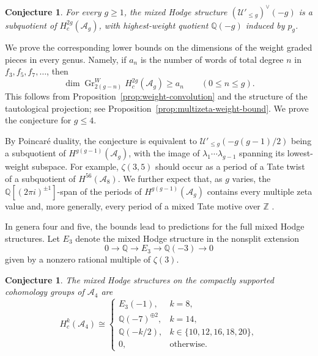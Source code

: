\documentclass[12 pt]{amsart}
\newcommand{\QQ}{\mathbb{Q}}
\newcommand{\ZZ}{\mathbb{Z}}
\newcommand{\cA}{\mathcal{A}}
\newcommand{\cU}{\mathcal{U}}
\newcommand{\Gr}{\operatorname{Gr}}
\newcommand{\<}{\langle}
\renewcommand{\>}{\rangle}
\newtheorem{conjecture}[theorem]{Conjecture}
\theoremstyle{definition}
\begin{document}
\begin{conjecture}\label{conj:multizeta-socle}
For every $g \geq 1$, the mixed Hodge structure $(\cU'_{\leq g})^\vee(-g)$ is a subquotient of $H_c^{2g}(\cA_g)$, with highest-weight quotient $\QQ(-g)$ induced by $p_g$.
\end{conjecture}

\noindent We prove the corresponding lower bounds on the dimensions of the weight graded pieces in every genus. Namely, if $a_n$ is the number of words of total degree $n$ in $f_3, f_5, f_7, \ldots$, then
\[
\dim \Gr_{2(g - n)}^W H_c^{2g}(\cA_g) \geq a_n \qquad (0 \leq n \leq g).
\]
This follows from Proposition~\ref{prop:weight-convolution} and the structure of the tautological projection; see Proposition~\ref{prop:multizeta-weight-bound}. We prove the conjecture for $g \leq 4$.

By Poincar\'e duality, the conjecture is equivalent to $\cU'_{\leq g}(-g(g - 1)/2)$ being a subquotient of $H^{g(g - 1)}(\cA_g)$, with the image of $\lambda_1 \cdots \lambda_{g - 1}$ spanning its lowest-weight subspace. For example, $\zeta(3, 5)$ should occur as a period of a Tate twist of a subquotient of $H^{56}(\cA_8)$. We further expect that, as $g$ varies, the $\QQ[(2 \pi i)^{\pm 1}]$-span of the periods of $H^{g(g - 1)}(\cA_g)$ contains every multiple zeta value and, more generally, every period of a mixed Tate motive over $\ZZ$ \cite[Corollary~1.2]{BrownMixedTate}.

In genera four and five, the bounds lead to predictions for the full mixed Hodge structures. Let $E_3$ denote the mixed Hodge structure in the nonsplit extension
\begin{equation}\label{eq:zeta-three-extension}
0 \longrightarrow \QQ \longrightarrow E_3 \longrightarrow \QQ(-3) \longrightarrow 0
\end{equation}
given by a nonzero rational multiple of $\zeta(3)$.

\begin{conjecture}\label{conj:genus-four-mhs}
The mixed Hodge structures on the compactly supported cohomology groups of $\cA_4$ are
\[
H_c^k(\cA_4) \cong
\begin{cases}
E_3(-1), & k = 8,\\
\QQ(-7)^{ \oplus 2}, & k = 14,\\
\QQ(-k/2), & k \in \{10, 12, 16, 18, 20\},\\
0, & \text{otherwise}.
\end{cases}
\]
\end{conjecture}
\end{document}
